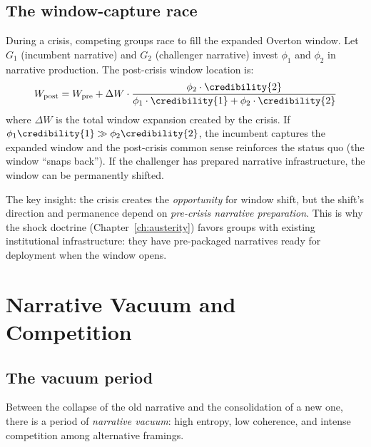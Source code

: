 \subsection{The window-capture race}

\begin{model}
\label{mod:overton-capture}
During a crisis, competing groups race to fill the expanded Overton window.
Let $G_1$ (incumbent narrative) and $G_2$ (challenger narrative) invest $\phi_1$ and $\phi_2$ in narrative production.
The post-crisis window location is:
\[
  W_{\text{post}} = W_{\text{pre}} + \Delta W \cdot \frac{\phi_2 \cdot \credibility{2}}{\phi_1 \cdot \credibility{1} + \phi_2 \cdot \credibility{2}}
\]
where $\Delta W$ is the total window expansion created by the crisis.
If $\phi_1 \credibility{1} \gg \phi_2 \credibility{2}$, the incumbent captures the expanded window and the post-crisis common sense reinforces the status quo (the window ``snaps back'').
If the challenger has prepared narrative infrastructure, the window can be permanently shifted.
\end{model}

The key insight: the crisis creates the \emph{opportunity} for window shift, but the shift's direction and permanence depend on \emph{pre-crisis narrative preparation}.
This is why the shock doctrine (Chapter~\ref{ch:austerity}) favors groups with existing institutional infrastructure: they have pre-packaged narratives ready for deployment when the window opens.

\section{Narrative Vacuum and Competition}
\label{sec:ch29-vacuum}

\subsection{The vacuum period}

Between the collapse of the old narrative and the consolidation of a new one, there is a period of \emph{narrative vacuum}: high entropy, low coherence, and intense competition among alternative framings.

